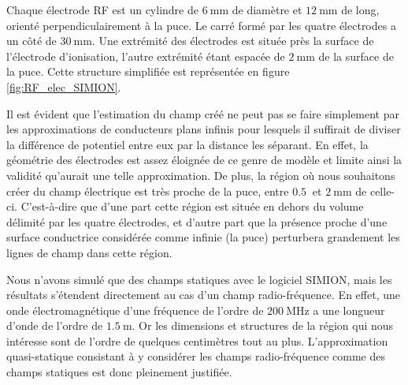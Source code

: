 \newpage
Chaque électrode RF est un cylindre de $\SI{6}{\mm}$ de diamètre et $\SI{12}{\mm}$ de long, orienté perpendiculairement à la puce.
Le carré formé par les quatre électrodes a un côté de $\SI{30}{\mm}$.
Une extrémité des électrodes est située près la surface de l'électrode d'ionisation, l'autre extrémité étant espacée de $\SI{2}{\mm}$ de la surface de la puce.
Cette structure simplifiée est représentée en figure \eqref{fig:RF_elec_SIMION}.

Il est évident que l'estimation du champ créé ne peut pas se faire simplement par les approximations de conducteurs plans infinis pour lesquels il suffirait de diviser la différence de potentiel entre eux par la distance les séparant.
En effet, la géométrie des électrodes est assez éloignée de ce genre de modèle et limite ainsi la validité qu'aurait une telle approximation.
De plus, la région où nous souhaitons créer du champ électrique est très proche de la puce, entre $\SI{0.5}{}$ et $\SI{2}{\mm}$ de celle-ci.
C'est-à-dire que d'une part cette région est située en dehors du volume délimité par les quatre électrodes, et d'autre part que la présence proche d'une surface conductrice considérée comme infinie (la puce) perturbera grandement les lignes de champ dans cette région.

Nous n'avons simulé que des champs statiques avec le logiciel SIMION, mais les résultats s'étendent directement au cas d'un champ radio-fréquence.
En effet, une onde électromagnétique d'une fréquence de l'ordre de $\SI{200}{\MHz}$ a une longueur d'onde de l'ordre de $\SI{1.5}{\m}$.
Or les dimensions et structures de la région qui nous intéresse sont de l'ordre de quelques centimètres tout au plus.
L'approximation quasi-statique consistant à y considérer les champs radio-fréquence comme des champs statiques est donc pleinement justifiée.

